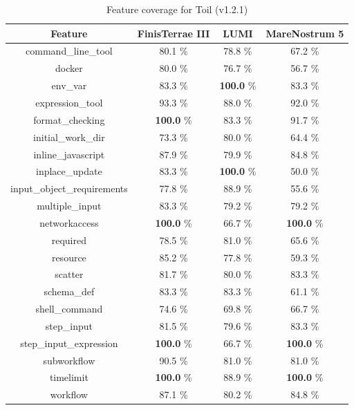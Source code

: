 \documentclass{article}
\begin{document}
\begin{table}[ht!]
\centering
\setlength{\tabcolsep}{6pt}
\renewcommand{\arraystretch}{1.2}
\begin{tabular}{|c|c|c|c|}
\hline
\rowcolor{lightgray!50}
\textbf{Feature} & \textbf{FinisTerrae III} & \textbf{LUMI} & \textbf{MareNostrum 5} \\
\hline
command\_line\_tool & 80.1 \% & 78.8 \% & 67.2 \% \\
docker & 80.0 \% & 76.7 \% & 56.7 \% \\
env\_var & 83.3 \% & \textbf{100.0} \% & 83.3 \% \\
expression\_tool & 93.3 \% & 88.0 \% & 92.0 \% \\
format\_checking & \textbf{100.0} \% & 83.3 \% & 91.7 \% \\
initial\_work\_dir & 73.3 \% & 80.0 \% & 64.4 \% \\
inline\_javascript & 87.9 \% & 79.9 \% & 84.8 \% \\
inplace\_update & 83.3 \% & \textbf{100.0} \% & 50.0 \% \\
input\_object\_requirements & 77.8 \% & 88.9 \% & 55.6 \% \\
multiple\_input & 83.3 \% & 79.2 \% & 79.2 \% \\
networkaccess & \textbf{100.0} \% & 66.7 \% & \textbf{100.0} \% \\
required & 78.5 \% & 81.0 \% & 65.6 \% \\
resource & 85.2 \% & 77.8 \% & 59.3 \% \\
scatter & 81.7 \% & 80.0 \% & 83.3 \% \\
schema\_def & 83.3 \% & 83.3 \% & 61.1 \% \\
shell\_command & 74.6 \% & 69.8 \% & 66.7 \% \\
step\_input & 81.5 \% & 79.6 \% & 83.3 \% \\
step\_input\_expression & \textbf{100.0} \% & 66.7 \% & \textbf{100.0} \% \\
subworkflow & 90.5 \% & 81.0 \% & 81.0 \% \\
timelimit & \textbf{100.0} \% & 88.9 \% & \textbf{100.0} \% \\
workflow & 87.1 \% & 80.2 \% & 84.8 \% \\
\hline
\end{tabular}
\caption{Feature coverage for Toil (v1.2.1)}
\label{tab:toil_feat_v12}
\end{table}
\end{document}
